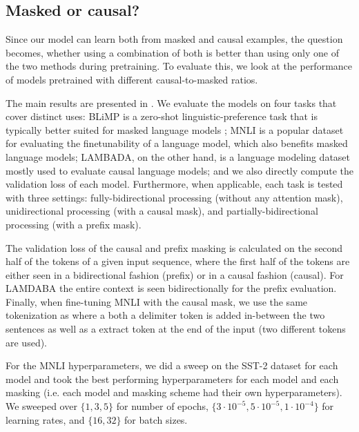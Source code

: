\subsection{Masked or causal?}

Since our model can learn both from masked and causal examples, the question becomes, whether using a combination of both is better than using only one of the two methods during pretraining. To evaluate this, we look at the performance of models pretrained with different causal-to-masked ratios. 

The main results are presented in . We evaluate the models on four tasks that cover distinct uses:  BLiMP is a zero-shot linguistic-preference task that is typically better suited for masked language models \citep{salazar-etal-2020-masked};  MNLI is a popular dataset for evaluating the finetunability of a language model, which also benefits masked language models;  LAMBADA, on the other hand, is a language modeling dataset mostly used to evaluate causal language models; and  we also directly compute the validation loss of each model. Furthermore, when applicable, each task is tested with three settings: fully-bidirectional processing (without any attention mask), unidirectional processing (with a causal mask), and partially-bidirectional processing (with a prefix mask).

The validation loss of the causal and prefix masking is calculated on the second half of the tokens of a given input sequence, where the first half of the tokens are either seen in a bidirectional fashion (prefix) or in a causal fashion (causal). For LAMDABA the entire context is seen bidirectionally for the prefix evaluation. Finally, when fine-tuning MNLI with the causal mask, we use the same tokenization as \citet{Radford2018ImprovingLU} where a both a delimiter token is added in-between the two sentences as well as a extract token at the end of the input (two different tokens are used).

For the MNLI hyperparameters, we did a sweep on the SST-2 dataset for each model and took the best performing hyperparameters for each model and each masking (i.e. each model and masking scheme had their own hyperparameters). We sweeped over $\{1, 3, 5\}$ for number of epochs, $\{3\cdot10^{-5}, 5\cdot10^{-5}, 1\cdot10^{-4}\}$ for learning rates, and $\{16, 32\}$ for batch sizes.

